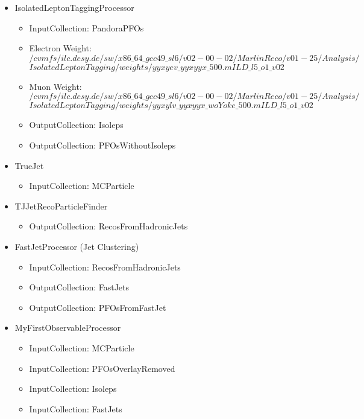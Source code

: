 \begin{itemize}
	\item IsolatedLeptonTaggingProcessor
		\begin{itemize}
			\item InputCollection: PandoraPFOs
			\item Electron Weight:\\
            \texttt{$/cvmfs/ilc.desy.de/sw/x86\_64\_gcc49\_sl6/v02-00-02/MarlinReco/v01-25/Analysis/$}
            \texttt{$IsolatedLeptonTagging/weights/yyxyev\_yyxyyx\_500.mILD\_l5\_o1\_v02$}
			\item Muon Weight: \\
            \texttt{$/cvmfs/ilc.desy.de/sw/x86\_64\_gcc49\_sl6/v02-00-02/MarlinReco/v01-25/Analysis/$}
            \texttt{$IsolatedLeptonTagging/weights/yyxylv\_yyxyyx\_woYoke\_500.mILD\_l5\_o1\_v02$}
			\item OutputCollection: Isoleps
			\item OutputCollection: PFOsWithoutIsoleps
		\end{itemize}
	\item TrueJet
		\begin{itemize}
			\item InputCollection: MCParticle
        \end{itemize}
    \item TJJetRecoParticleFinder
        \begin{itemize}
			\item OutputCollection: RecosFromHadronicJets
		\end{itemize}
	\item FastJetProcessor (Jet Clustering)
		\begin{itemize}
			\item InputCollection: RecosFromHadronicJets
			\item OutputCollection: FastJets
			\item OutputCollection: PFOsFromFastJet
		\end{itemize}
	\item MyFirstObservableProcessor
		\begin{itemize}
			\item InputCollection: MCParticle
			\item InputCollection: PFOsOverlayRemoved
			\item InputCollection: Isoleps
			\item InputCollection: FastJets
		\end{itemize}
\end{itemize}


